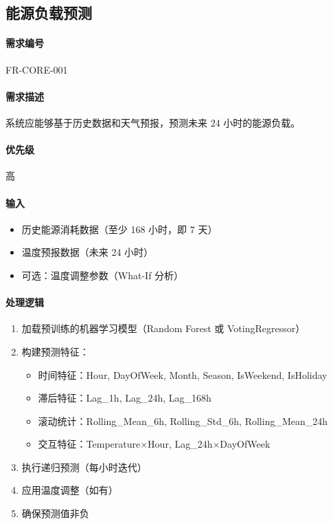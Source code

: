 \subsection{能源负载预测}

\paragraph{需求编号} FR-CORE-001

\paragraph{需求描述} 系统应能够基于历史数据和天气预报，预测未来 24 小时的能源负载。

\paragraph{优先级} 高

\paragraph{输入}
\begin{itemize}
    \item 历史能源消耗数据（至少 168 小时，即 7 天）
    \item 温度预报数据（未来 24 小时）
    \item 可选：温度调整参数（What-If 分析）
\end{itemize}

\paragraph{处理逻辑}
\begin{enumerate}
    \item 加载预训练的机器学习模型（Random Forest 或 VotingRegressor）
    \item 构建预测特征：
          \begin{itemize}
              \item 时间特征：Hour, DayOfWeek, Month, Season, IsWeekend, IsHoliday
              \item 滞后特征：Lag\_1h, Lag\_24h, Lag\_168h
              \item 滚动统计：Rolling\_Mean\_6h, Rolling\_Std\_6h, Rolling\_Mean\_24h
              \item 交互特征：Temperature×Hour, Lag\_24h×DayOfWeek
          \end{itemize}
    \item 执行递归预测（每小时迭代）
    \item 应用温度调整（如有）
    \item 确保预测值非负
\end{enumerate}

